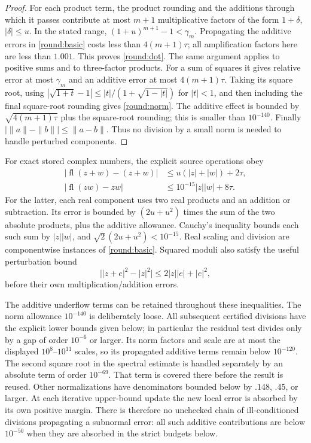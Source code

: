 \begin{proof}
For each product term, the product rounding and the additions through
which it passes contribute at most $m+1$ multiplicative factors of the
form $1+\delta$, $|\delta|\le u$.  In the stated range,
$(1+u)^{m+1}-1<\gamma_m$.  Propagating the additive errors in
\eqref{round:basic} costs less than $4(m+1)\tau$; all amplification
factors here are less than $1.001$.  This proves \eqref{round:dot}.
The same argument applies to positive sums and to three-factor products.
For a sum of squares it gives relative error at most $\gamma_m$ and an
additive error at most $4(m+1)\tau$.  Taking its square root, using
$|\sqrt{1+t}-1|\le |t|/(1+\sqrt{1-|t|})$ for $|t|<1$, and then including
the final square-root rounding gives \eqref{round:norm}.  The additive
effect is bounded by $\sqrt{4(m+1)\tau}$ plus the square-root rounding;
this is smaller than $10^{-140}$.  Finally
$|\|a\|-\|b\||\le\|a-b\|$.  Thus no division by a small norm is needed
to handle perturbed components.
\end{proof}

For exact stored complex numbers, the explicit source operations obey
\begin{align}
 |\operatorname{fl}(z+w)-(z+w)|
   &\le u(|z|+|w|)+2\tau,\label{round:complex-add}\\
 |\operatorname{fl}(zw)-zw|
   &\le 10^{-15}|z||w|+8\tau.\label{round:complex-multiply}
\end{align}
For the latter, each real component uses two real products and an
addition or subtraction.  Its error is bounded by
$(2u+u^2)$ times the sum of the two absolute products, plus the additive
allowance.  Cauchy's inequality bounds each such sum by $|z||w|$, and
$\sqrt2(2u+u^2)<10^{-15}$.  Real scaling and division are componentwise
instances of \eqref{round:basic}.  Squared moduli also satisfy the useful
perturbation bound
\begin{equation}\label{round:squared-perturbation}
 \big||z+e|^2-|z|^2\big|\le2|z||e|+|e|^2,
\end{equation}
before their own multiplication/addition errors.

The additive underflow terms can be retained throughout these
inequalities.  The norm allowance $10^{-140}$ is deliberately loose.
All subsequent certified divisions have the explicit lower bounds
given below; in particular the residual test divides only by a gap
of order $10^{-6}$ or larger.  Its norm factors and scale are at most
the displayed $10^8$--$10^{11}$ scales, so its propagated additive
terms remain below $10^{-120}$.  The second square root in the spectral
estimate is handled separately by an absolute term of order
$10^{-69}$.  That term is covered there before the result is reused.
Other normalizations have denominators bounded below by $.148$, $.45$,
or larger.  At each iterative upper-bound update the new local error is
absorbed by its own positive margin.  There is therefore no unchecked
chain of ill-conditioned divisions propagating a subnormal error: all
such additive contributions are below $10^{-50}$ when they are
absorbed in the strict budgets below.

